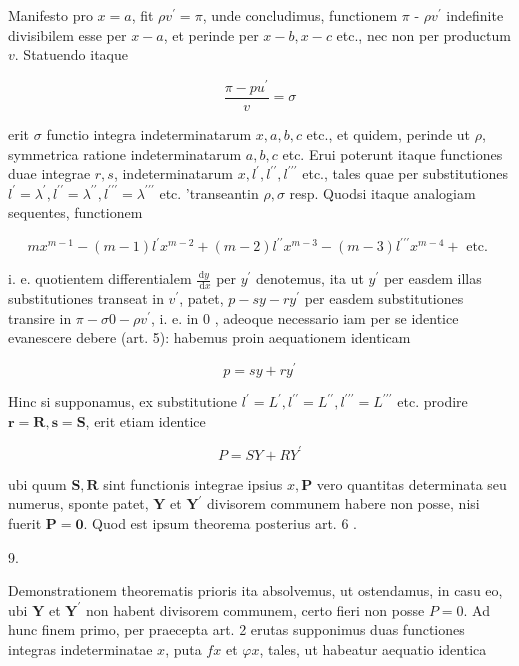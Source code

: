 \documentclass[10pt]{article}
\begin{document}
Manifesto pro \(x=a\), fit \(\rho v^{\prime}=\pi\), unde concludimus, functionem \(\pi\) - \(\rho v^{\prime}\) indefinite divisibilem esse per \(x-a\), et perinde per \(x-b, x-c\) etc., nec non per productum \(v\). Statuendo itaque

\[
\frac{\pi-p u^{\prime}}{v}=\sigma
\]

erit \(\sigma\) functio integra indeterminatarum \(x, a, b, c\) etc., et quidem, perinde ut \(\rho\), symmetrica ratione indeterminatarum \(a, b, c\) etc. Erui poterunt itaque functiones duae integrae \(r, s\), indeterminatarum \(x, l^{\prime}, l^{\prime \prime}, l^{\prime \prime \prime}\) etc., tales quae per substitutiones \(l^{\prime}=\lambda^{\prime}, l^{\prime \prime}=\lambda^{\prime \prime}, l^{\prime \prime \prime}=\lambda^{\prime \prime \prime}\) etc. 'transeantin \(\rho, \sigma\) resp. Quodsi itaque analogiam sequentes, functionem

\[
m x^{m-1}-(m-1) l^{\prime} x^{m-2}+(m-2) l^{\prime \prime} x^{m-3}-(m-3) l^{\prime \prime \prime} x^{m-4}+\text { etc. }
\]

i. e. quotientem differentialem \(\frac{\mathrm{d} y}{\mathrm{~d} x}\) per \(y^{\prime}\) denotemus, ita ut \(y^{\prime}\) per easdem illas
substitutiones transeat in \(v^{\prime}\), patet, \(p-s y-r y^{\prime}\) per easdem substitutiones transire in \(\pi-\sigma 0-\rho v^{\prime}\), i. e. in 0 , adeoque necessario iam per se identice evanescere debere (art. 5): habemus proin aequationem identicam

\[
p=s y+r y^{\prime}
\]

Hinc si supponamus, ex substitutione \(l^{\prime}=L^{\prime}, l^{\prime \prime}=L^{\prime \prime}, l^{\prime \prime \prime}=L^{\prime \prime \prime}\) etc. prodire \(\boldsymbol{r}=\boldsymbol{R}, \boldsymbol{s}=\boldsymbol{S}\), erit etiam identice

\[
P=S Y+R Y^{\prime}
\]

ubi quum \(\boldsymbol{S}, \boldsymbol{R}\) sint functionis integrae ipsius \(x, \boldsymbol{P}\) vero quantitas determinata seu numerus, sponte patet, \(\boldsymbol{Y}\) et \(\boldsymbol{Y}^{\prime}\) divisorem communem habere non posse, nisi fuerit \(\boldsymbol{P}=\mathbf{0}\). Quod est ipsum theorema posterius art. 6 .

9.

Demonstrationem theorematis prioris ita absolvemus, ut ostendamus, in casu eo, ubi \(\boldsymbol{Y}\) et \(\boldsymbol{Y}^{\prime}\) non habent divisorem communem, certo fieri non posse \(P=0\). Ad hunc finem primo, per praecepta art. 2 erutas supponimus duas functiones integras indeterminatae \(x\), puta \(f x\) et \(\varphi x\), tales, ut habeatur aequatio identica
\end{document}
